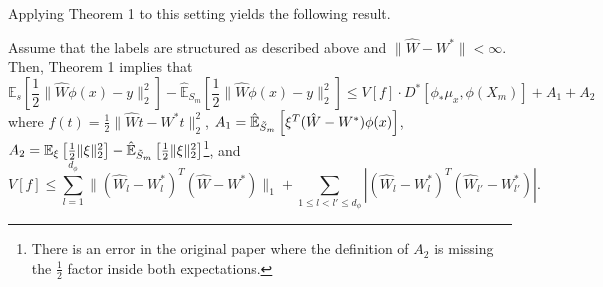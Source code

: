 \documentclass{article}
\newenvironment{manualtheorem}[1]{%
  \renewcommand\themanualtheoreminner{#1}%
  \manualtheoreminner
}{\endmanualtheoreminner}
\begin{document}
Applying Theorem 1 to this setting yields the following result.

\begin{manualtheorem}{2}
    Assume that the labels are structured as described above and $\lVert \hat{W} - W^* \rVert < \infty$. Then, Theorem 1 implies that 
    \[\mathbb{E}_{s} \left[ \frac{1}{2} \lVert \hat{W} \phi(x) - y \rVert_{2}^{2} \right] - \hat{\mathbb{E}}_{S_m} \left[ \frac{1}{2} \lVert \hat{W} \phi(x) - y \rVert_{2}^{2} \right] \leq V[f] \cdot D^* \left[\phi_{*} \mu_{x}, \phi(X_m) \right] + A_1 + A_2 \]
    where $f(t) = \frac{1}{2} \lVert \hat{W}t - W^* t \rVert_2^2$, $A_1 = \hat{\mathbb{E}}_{\Tilde{S}_m} \left[\xi^T (\hat{W} - W^*) \phi(x) \right]$, $A_2 = \mathbb{E}_{\xi} \left[\frac{1}{2} \lVert \xi \rVert_2^2 \right] - \hat{\mathbb{E}}_{\Tilde{S}_m} \left[\frac{1}{2} \lVert \xi \rVert_2^2 \right]${\color{red}\footnote{There is an error in the original paper where the definition of $A_2$ is missing the $\frac{1}{2}$ factor inside both expectations.}}, and
    \[V[f] \leq \sum_{l=1}^{d_\phi} \lVert(\hat{W}_l - W^{*}_{l} )^T (\hat{W} - W^*) \rVert_1 + \sum_{1 \leq l < l' \leq d_{\phi}} \left|(\hat{W}_l - W^{*}_{l} )^T (\hat{W}_{l'} - W^{*}_{l'})\right|. \]
\end{manualtheorem}
\end{document}
